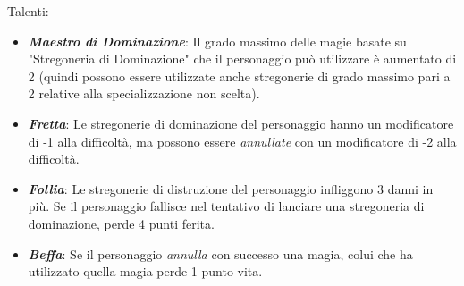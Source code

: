 \documentclass[../manuale_main.tex]{subfiles}
\begin{document}
Talenti:

\begin{itemize}
\item \textbf{\textit{Maestro di Dominazione}}: Il grado massimo delle magie basate su "Stregoneria di Dominazione" che il personaggio può utilizzare è aumentato di 2 (quindi possono essere utilizzate anche stregonerie di grado massimo pari a 2 relative alla specializzazione non scelta).
\item \textbf{\textit{Fretta}}: Le stregonerie di dominazione del personaggio hanno un modificatore di -1 alla difficoltà, ma possono essere \textit{annullate} con un modificatore di -2 alla difficoltà.
\item \textbf{\textit{Follia}}: Le stregonerie di distruzione del personaggio infliggono 3 danni in più. Se il personaggio fallisce nel tentativo di lanciare una stregoneria di dominazione, perde 4 punti ferita.
\item \textbf{\textit{Beffa}}: Se il personaggio \textit{annulla} con successo una magia, colui che ha utilizzato quella magia perde 1 punto vita.
\end{itemize}
\end{document}
